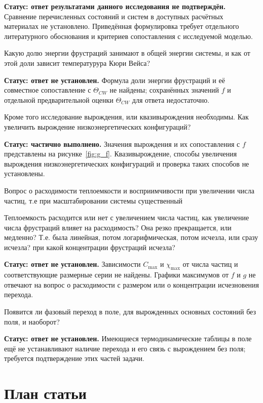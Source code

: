\documentclass[utf8, babel, sor, jor, amsmath, amssymb, reprint]{elsarticle} %
\begin{document}
\textbf{Статус: ответ результатами данного исследования не подтверждён.} Сравнение перечисленных состояний и систем в доступных расчётных материалах не установлено. Приведённая формулировка требует отдельного литературного обоснования и критериев сопоставления с исследуемой моделью.


Какую долю энергии фрустраций занимают в общей энергии системы, и как от этой доли зависит температурура Кюри Вейса?

\textbf{Статус: ответ не установлен.} Формула доли энергии фрустраций и её совместное сопоставление с $\Theta_{CW}$ не найдены; сохранённых значений $f$ и отдельной предварительной оценки $\Theta_{CW}$ для ответа недостаточно.

Кроме того исследование вырождения, или квазивырождения необходимы. Как увеличить вырождение низкоэнергетических  конфигураций?

\textbf{Статус: частично выполнено.} Значения вырождения и их сопоставления с $f$ представлены на рисунке~\ref{fig:g_f}. Квазивырождение, способы увеличения вырождения низкоэнергетических конфигураций и проверка таких способов не установлены.

Вопрос о расходимости теплоемкости и восприимчивости при увеличении числа частиц, т.е при масштабировании системы существенный

Теплоемкость расходится или нет с увеличением числа частиц, как увеличение числа фрустраций влияет на расходимость? Она резко прекращается, или медленно? Т.е. была линейная, потом логарифмическая, потом исчезла, или сразу исчезла? при какой концентрации фрустраций исчезла?

\textbf{Статус: ответ не установлен.} Зависимости $C_{\max}$ и $\chi_{\max}$ от числа частиц и соответствующие размерные серии не найдены. Графики максимумов от $f$ и $g$ не отвечают на вопрос о расходимости с размером или о концентрации исчезновения перехода.

Появится ли фазовый переход в поле, для вырожденных основных состояний без поля, и наоборот?

\textbf{Статус: ответ не установлен.} Имеющиеся термодинамические таблицы в поле ещё не устанавливают наличие перехода и его связь с вырождением без поля; требуется подтверждение этих частей задачи.




\section{План статьи}
\end{document}
